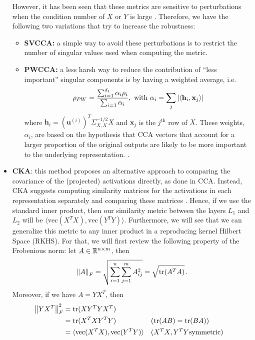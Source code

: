 \documentclass[../main.tex]{subfiles}
\begin{document}
\begin{itemize}
    However, it has been seen that these metrics are sensitive to perturbations when the condition number of $X$ or $Y$ is large \cite{kornblith_similarity_2019}. Therefore, we have the following two variations that try to increase the robustness:
    \begin{itemize}
        \item \textbf{SVCCA:} a simple way to avoid these perturbations is to restrict the number of singular values used when computing the metric.
        \item \textbf{PWCCA:} a less harsh way to reduce the contribution of ``less important'' singular components is by having a weighted average, i.e.
        \[
        \rho_{PW} = \frac{\sum_{i=1}^{d_1}\alpha_i \rho_i}{\sum_{i=1}\alpha_i},\text{ with } \alpha_i = \sum_j \left\lvert \langle 
\mathbf{h}_i, \mathbf{x}_j \rangle \right\rvert
        \]
        where $\mathbf{h}_i = (\mathbf{u}^{(i)})^T\Sigma_{X, X}^{-1/2}X $ and $\mathbf{x}_j$ is the $j^{\text{th}}$ row of $X$. These weights, $\alpha_i$, are based on the hypothesis that CCA vectors that account for a larger proportion of the original outputs are likely to be more important to the underlying representation. \cite{morcos_insights_2018}.
    \end{itemize}

    \item \textbf{CKA}: this method proposes an alternative approach to comparing the covariance of the (projected) activations directly, as done in CCA. Instead, CKA suggests computing similarity matrices for the activations in each representation separately and comparing these matrices \cite{kornblith_similarity_2019}. Hence, if we use the standard inner product, then our similarity metric between the layers $L_1$ and $L_2$ will be $\langle \text{vec}(X^T X), \text{vec}(Y^T Y) \rangle$. Furthermore, we will see that we can generalize this metric to any inner product in a reproducing kernel Hilbert Space (RKHS). For that, we will first review the following property of the Frobenious norm: let $A \in \mathbb{R}^{n \times m}$, then
    \[
    \left\lVert A \right\rVert_F = \sqrt{\sum_{i=1}^n\sum_{j=1}^m A_{ij}^2} = \sqrt{\text{tr}(A^TA)}\,.
    \]
    Moreover, if we have $A=Y X^T$, then
    \begin{align*}
    \left\lVert Y X^T \right\rVert_F^2 &= \text{tr}(X Y^T Y X^T) \\
    &= \text{tr}(X^T X Y^T Y) &&(\text{tr}(AB) = \text{tr}(BA))\\
    &= \langle \text{vec}(X^TX), \text{vec}(Y^TY) \rangle && (X^TX, Y^TY \text{symmetric})
    \end{align*}
    

\end{itemize}
\end{document}
